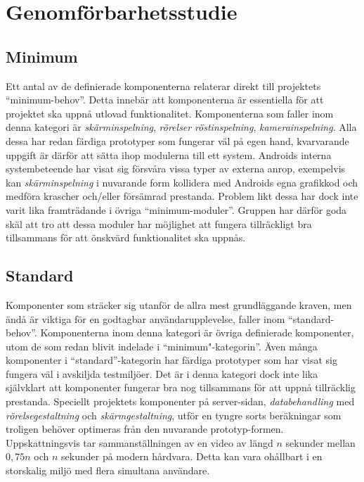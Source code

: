 \section{Genomförbarhetsstudie}
\label{sec:estimates}

\subsection{Minimum} %
\label{sub:Minimum}

Ett antal av de definierade komponenterna relaterar direkt till projektets ``minimum-behov''. Detta innebär att komponenterna är essentiella för att projektet ska uppnå utlovad funktionalitet. Komponenterna som faller inom denna kategori är \textit{skärminspelning}, \textit{rörelser} \textit{röstinspelning}, \textit{kamerainspelning}. Alla dessa har redan färdiga prototyper som fungerar väl på egen hand, kvarvarande uppgift är därför att sätta ihop modulerna till ett system. Androids interna systembeteende har visat sig försvåra vissa typer av externa anrop, exempelvis kan \textit{skärminspelning} i nuvarande form kollidera med Androids egna grafikkod och medföra krascher och/eller försämrad prestanda. Problem likt dessa har dock inte varit lika framträdande i övriga ``minimum-moduler''. Gruppen har därför goda skäl att tro att dessa moduler har möjlighet att fungera tillräckligt bra tillsammans för att önskvärd funktionalitet ska uppnås.

\subsection{Standard} %
\label{sub:Standard}

Komponenter som sträcker sig utanför de allra mest grundläggande kraven, men ändå är viktiga för en godtagbar användarupplevelse, faller inom ``standard-behov''. Komponenterna inom denna kategori är övriga definierade komponenter, utom de som redan blivit indelade i ``minimum"-kategorin''. Även många komponenter i ``standard''-kategorin har färdiga prototyper som har visat sig fungera väl i avskiljda testmiljöer. Det är i denna kategori dock inte lika självklart att komponenter fungerar bra nog tillsammans för att uppnå tillräcklig prestanda. Speciellt projektets komponenter på server-sidan, \textit{databehandling} med \textit{rörelsegestaltning} och \textit{skärmgestaltning}, utför en tyngre sorts beräkningar som troligen behöver optimeras från den nuvarande prototyp-formen. Uppskattningsvis tar sammanställningen av en video av längd $n$ sekunder mellan $0,{}75n$ och $n$ sekunder på modern hårdvara. Detta kan vara ohållbart i en storskalig miljö med flera simultana användare.

